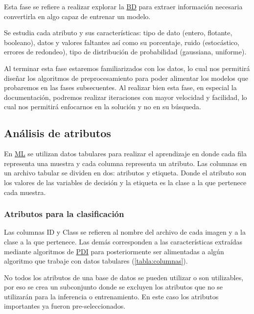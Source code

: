 Esta fase se refiere a realizar explorar la \hyperlink{abbr}{BD} para extraer información
necesaria convertirla en algo capaz de entrenar un modelo. 

Se estudia cada atributo y sus características: tipo de dato (entero, flotante,
booleano), datos y valores faltantes así como su porcentaje, ruido (estocástico,
errores de redondeo), tipo de distribución de probabilidad (gaussiana, uniforme).

Al terminar esta fase estaremos familiarizados con los datos, lo cual nos
permitirá diseñar los algoritmos de preprocesamiento para poder alimentar los
modelos que probaremos en las fases subsecuentes. Al realizar bien esta fase, en
especial la documentación, podremos realizar iteraciones con mayor velocidad y
facilidad, lo cual nos permitirá enfocarnos en la solución y no en su búsqueda.

\subsection{Análisis de atributos}

En \hyperlink{abbr}{ML} se utilizan datos tabulares para realizar el aprendizaje
en donde cada fila representa una muestra y cada columna representa un atributo.
Las columnas en un archivo tabular se dividen en dos: atributos y etiqueta.
Donde el atributo son los valores de las variables de decisión y la etiqueta es
la clase a la que pertenece cada muestra.

\subsubsection{Atributos para la clasificación}

Las columnas ID y Class se refieren al nombre del archivo de cada imagen y a la
clase a la que pertenece. Las demás corresponden a las características extraídas
mediante algoritmos de \hyperlink{abbr}{PDI} para posteriormente ser alimentadas
a algún algoritmo que trabaje con datos tabulares (\autoref{tabla:columnas}).

No todos los atributos de una base de datos se pueden utilizar o son
utilizables, por eso se crea un subconjunto donde se excluyen los atributos que
no se utilizarán para la inferencia o entrenamiento. En este caso los atributos
importantes ya fueron pre-seleccionados.

